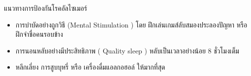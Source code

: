 \documentclass[xetex,serif]{beamer}
\begin{document}
\begin{frame}{แนวทางการป้องกันโรคอัลไซเมอร์}
  \begin{itemize}
    \item การบำบัดอย่างถูกวิธี (Mental Stimulation ) โดย ฝึกเล่นเกมส์ลับสมองประลองปัญหา หรือ ฝึกจําชื่อคนรอบข้าง
    \item การนอนหลับอย่างมีประสิทธิภาพ ( Quality sleep ) หลับเป็นเวลาอย่างน้อย 8 ชั่วโมงเต็ม
    \item หลีกเลี่ยง การสูบบุหรี่ หรือ เครื่องดื่มแอลกอฮอล์ ให้มากที่สุด
  \end{itemize}
\end{frame}
\end{document}
